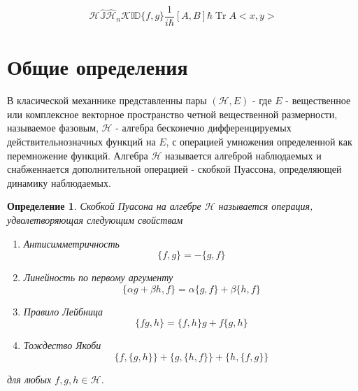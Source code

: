 \documentclass[10pt,a4paper]{article}
\begin{document}
\newtheorem{notion}{Замечание}
\newtheorem{exercise}{Упражнение}[section]
\newtheorem{theorem}{Теорема}[section]
\newtheorem{proposition}{Утверждение}[section]
\newtheorem{definition}{Определение}[section]

\newcommand{\Js}{\mathbb{J}}
\newcommand{\Real}{\mathbb{R}}
\newcommand{\Comp}{\mathbb{C}}
\newcommand{\Nat}{\mathbb{N}}

\newcommand{\Jsq}{\hat{\mathbb{J}}}


\newcommand{\Hs}{\mathcal{H}}
\newcommand{\Is}{\mathbb{I}}




\newcommand{\Hq}{\hat{\mathcal{H}}}
\newcommand{\Eq}{\hat{E}}

\newcommand{\Kq}{\mathcal{K}}
\newcommand{\Iq}{\mathbb{I}}
\newcommand{\Dq}{\mathbb{D}}

\newcommand{\Ii}{\operatorname{I}}
\newcommand{\Pbr}[2]{ \{ {#1},{#2}\} }
\newcommand{\Com}[2]{\frac{1}{i\hbar}[{#1},{#2}]}
\newcommand{\Tr}[1]{\operatorname{Tr}{#1}}
\newcommand{\Id}{\operatorname{Id}}
\newcommand{\Dual}[2]{<{#1},{#2}>}
\newcommand{\Abs}[1]{\vert{#1}\vert}


\[
\Hs
\Jsq
\Hq_n
\Kq\Iq\Dq
\Pbr{f}{g}
\Com{A}{B}
\hbar
\Tr{A}
\Dual{x}{y}
\]
\section{Общие определения}

В класической механнике \cite{Arnold} представленны пары $(\Hs,E)$ - где $E$ - вещественное или комплексное векторное пространство четной вещественной размерности, называемое фазовым, $\Hs$ - алгебра бесконечно дифференцируемых действительнозначных функций на $E$, с операцией умножения определенной как перемножение функций. Алгебра $\Hs$ называется алгеброй наблюдаемых и снабженнается дополнительной операцией - скобкой Пуассона, определяющей динамику наблюдаемых.

\begin{definition}
Скобкой Пуасона на алгебре $\Hs$ называется операция, удволетворяющая следующим свойствам 
\begin{enumerate}
\item Антисимметричность
\[\Pbr{f}{g}=-\Pbr{g}{f}\]
\item Линейность по первому аргументу
\[\Pbr{\alpha g+\beta h}{f}=\alpha\Pbr{g}{f}+\beta\Pbr{h}{f}\]
\item Правило Лейбница
\[\Pbr{fg}{h}=\Pbr{f}{h}g+f\Pbr{g}{h}\]
\item Тождество Якоби
\[\Pbr{f}{\Pbr{g}{h}}+\Pbr{g}{\Pbr{h}{f}}+\Pbr{h}{\Pbr{f}{g}}\]
\end{enumerate}
для любых $f,g,h\in\Hs$.
\end{definition} 
\end{document}
